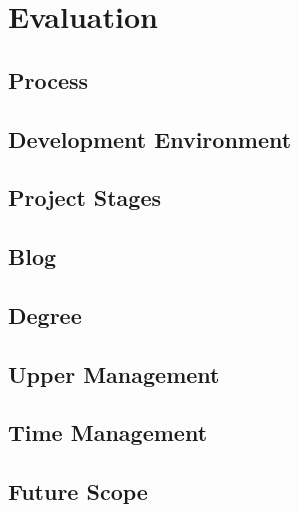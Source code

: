\chapter{Evaluation}
	
	\section{Process}
	
	\section{Development Environment}
	
	\section{Project Stages}
	
	\section{Blog}
	
	\section{Degree}
	
	\section{Upper Management}
	
	\section{Time Management}
	
	\section{Future Scope}
	
